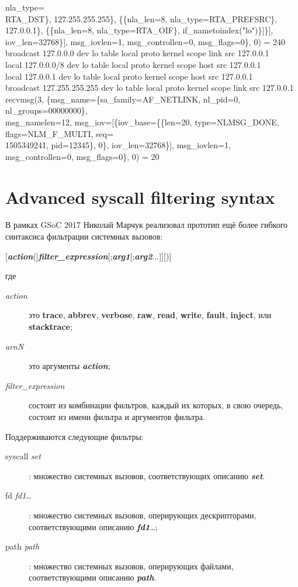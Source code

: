 {nla\_type=\\RTA\_DST\}, 127.255.255.255\}, \{\{nla\_len=8, nla\_type=RTA\_PREFSRC\}, 127.0.0.1\}, \{\{nla\_len=8, nla\_type=RTA\_OIF\}, if\_nametoindex("lo")\}]\}], iov\_len=32768\}], msg\_iovlen=1, msg\_controllen=0, msg\_flags=0\}, 0) = 240 \\
broadcast 127.0.0.0 dev lo table local proto kernel scope link src 127.0.0.1  \\
local 127.0.0.0/8 dev lo table local proto kernel scope host src 127.0.0.1 \\
local 127.0.0.1 dev lo table local proto kernel scope host src 127.0.0.1 \\
broadcast 127.255.255.255 dev lo table local proto kernel scope link src 127.0.0.1 \\
recvmsg(3, \{msg\_name=\{sa\_family=AF\_NETLINK, nl\_pid=0, nl\_groups=00000000\}, \\msg\_namelen=12, msg\_iov=[\{iov\_base=\{\{len=20, type=NLMSG\_DONE, flags=NLM\_F\_MULTI, seq=\\1505349241, pid=12345\}, 0\}, iov\_len=32768\}], msg\_iovlen=1, msg\_controllen=0, msg\_flags=0\}, 0) = 20
}

\section{Advanced syscall filtering syntax}

В рамках GSoC 2017 Николай Марчук реализовал прототип ещё более гибкого
синтаксиса фильтрации системных вызовов:

[\textbf{\textit{action}}(]\textbf{\textit{filter\_expression}}[;\textbf{\textit{arg1}}[;\textbf{\textit{arg2}}...]][)]

где
\begin{description}
\item[\textit{action}] это \textbf{trace}, \textbf{abbrev}, \textbf{verbose},
\textbf{raw}, \textbf{read}, \textbf{write}, \textbf{fault},
\textbf{inject}, или \textbf{stacktrace};
\item[\textit{arnN}] это аргументы \textbf{\textit{action}};
\item[\textit{filter\_expression}] состоит из комбинации фильтров,
каждый их которых, в свою очередь, состоит из имени фильтра и аргументов фильтра.
\end{description}

Поддерживаются следующие фильтры:
\begin{description}
\item[syscall \textit{set}]: множество системных вызовов,
соответствующих описанию \textbf{\textit{set}}.
\item[fd \textit{fd1}\dots]: множество системных вызовов,
оперирующих дескрипторами, соответствующими описанию \textbf{\textit{fd1}}\dots;
\item[path \textit{path}]: множество системных вызовов,
оперирующих файлами, соответствующими описанию \textbf{\textit{path}}.
\end{description}

